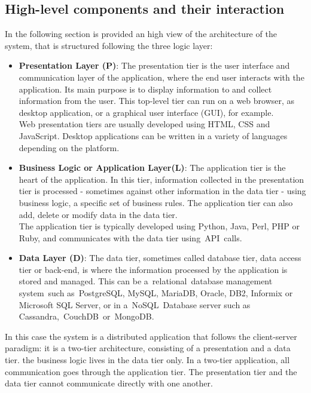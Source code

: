 \subsection{High-level components and their interaction}
In the following section is provided an high view of the architecture of the system, that is structured following the three logic layer:
\begin{itemize}
    \item \textbf{Presentation Layer (P)}: The presentation tier is the user interface and communication layer of the application, where the end user interacts with the application. Its main purpose is to display information to and collect information from the user. This top-level tier can run on a web browser, as desktop application, or a graphical user interface (GUI), for example. \\Web presentation tiers are usually developed using HTML, CSS and JavaScript. Desktop applications can be written in a variety of languages depending on the platform.
    \item \textbf{Business Logic or Application Layer(L)}: The application tier is the heart of the application. In this tier, information collected in the presentation tier is processed - sometimes against other information in the data tier - using business logic, a specific set of business rules. The application tier can also add, delete or modify data in the data tier.\\ The application tier is typically developed using Python, Java, Perl, PHP or Ruby, and communicates with the data tier using API calls. 
    \item \textbf{Data Layer (D)}: The data tier, sometimes called database tier, data access tier or back-end, is where the information processed by the application is stored and managed. This can be a relational database management system such as PostgreSQL, MySQL, MariaDB, Oracle, DB2, Informix or Microsoft SQL Server, or in a NoSQL Database server such as Cassandra, CouchDB or MongoDB. 
\end{itemize}

In this case the system is a distributed application that follows the client-server paradigm: it is a two-tier architecture, consisting of a presentation and a data tier. the business logic lives in the data tier only.
In a two-tier application, all communication goes through the application tier. The presentation tier and the data tier cannot communicate directly with one another. 

